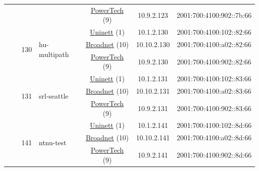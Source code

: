 \begin{small}
\begin{center}
\begin{longtable}{|c|c|c|c|c|c|c|c|}
  &  &  &  & \multicolumn{2}{|c|}{\tiny{\href{http://www.powertech.no}{PowerTech} (9)}} & \tiny{10.9.2.123} & \tiny{2001:700:4100:902::7b:66} \\* \cline{3-3}\cline{4-4}\cline{5-5}\cline{6-6}\cline{7-7}\cline{8-8}
  &  & \multirow{3}{*}{\tiny{130}} & \multicolumn{1}{|l|}{\multirow{3}{*}{\tiny{hu-multipath}}} & \multicolumn{2}{|c|}{\tiny{\href{https://www.uninett.no}{Uninett} (1)}} & \tiny{10.1.2.130} & \tiny{2001:700:4100:102::82:66} \\* \cline{5-5}\cline{6-6}\cline{7-7}\cline{8-8}
  &  &  &  & \multicolumn{2}{|c|}{\tiny{\href{https://www.broadnet.no}{Broadnet} (10)}} & \tiny{10.10.2.130} & \tiny{2001:700:4100:a02::82:66} \\* \cline{5-5}\cline{6-6}\cline{7-7}\cline{8-8}
  &  &  &  & \multicolumn{2}{|c|}{\tiny{\href{http://www.powertech.no}{PowerTech} (9)}} & \tiny{10.9.2.130} & \tiny{2001:700:4100:902::82:66} \\* \cline{3-3}\cline{4-4}\cline{5-5}\cline{6-6}\cline{7-7}\cline{8-8}
  &  & \multirow{3}{*}{\tiny{131}} & \multicolumn{1}{|l|}{\multirow{3}{*}{\tiny{srl-seattle}}} & \multicolumn{2}{|c|}{\tiny{\href{https://www.uninett.no}{Uninett} (1)}} & \tiny{10.1.2.131} & \tiny{2001:700:4100:102::83:66} \\* \cline{5-5}\cline{6-6}\cline{7-7}\cline{8-8}
  &  &  &  & \multicolumn{2}{|c|}{\tiny{\href{https://www.broadnet.no}{Broadnet} (10)}} & \tiny{10.10.2.131} & \tiny{2001:700:4100:a02::83:66} \\* \cline{5-5}\cline{6-6}\cline{7-7}\cline{8-8}
  &  &  &  & \multicolumn{2}{|c|}{\tiny{\href{http://www.powertech.no}{PowerTech} (9)}} & \tiny{10.9.2.131} & \tiny{2001:700:4100:902::83:66} \\* \cline{3-3}\cline{4-4}\cline{5-5}\cline{6-6}\cline{7-7}\cline{8-8}
  &  & \multirow{3}{*}{\tiny{141}} & \multicolumn{1}{|l|}{\multirow{3}{*}{\tiny{ntnu-test}}} & \multicolumn{2}{|c|}{\tiny{\href{https://www.uninett.no}{Uninett} (1)}} & \tiny{10.1.2.141} & \tiny{2001:700:4100:102::8d:66} \\* \cline{5-5}\cline{6-6}\cline{7-7}\cline{8-8}
  &  &  &  & \multicolumn{2}{|c|}{\tiny{\href{https://www.broadnet.no}{Broadnet} (10)}} & \tiny{10.10.2.141} & \tiny{2001:700:4100:a02::8d:66} \\* \cline{5-5}\cline{6-6}\cline{7-7}\cline{8-8}
  &  &  &  & \multicolumn{2}{|c|}{\tiny{\href{http://www.powertech.no}{PowerTech} (9)}} & \tiny{10.9.2.141} & \tiny{2001:700:4100:902::8d:66} \\* \cline{3-3}\cline{4-4}\cline{5-5}\cline{6-6}\cline{7-7}\cline{8-8}

\end{longtable}
\end{center}
\end{small}
